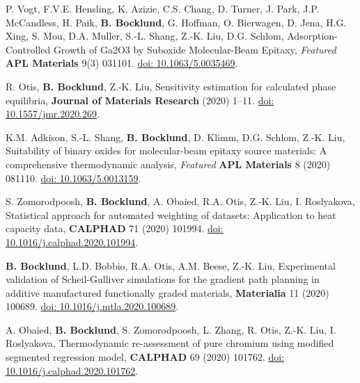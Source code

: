 \item P. Vogt, F.V.E. Hensling, K. Azizie, C.S. Chang, D. Turner, J. Park, J.P. McCandless, H. Paik, \textbf{B. Bocklund}, G. Hoffman, O. Bierwagen, D. Jena, H.G. Xing, S. Mou, D.A. Muller, S.-L. Shang, Z.-K. Liu, D.G. Schlom,
Adsorption-Controlled Growth of Ga2O3 by Suboxide Molecular-Beam Epitaxy,
  \textit{Featured} \textbf{APL Materials} 9(3) 031101.
  \href{https://doi.org/10.1063/5.0035469}{doi: 10.1063/5.0035469}.


\item R. Otis, \textbf{B. Bocklund}, Z.-K. Liu,
Sensitivity estimation for calculated phase equilibria,
  \textbf{Journal of Materials Research} (2020) 1–11.
  \href{https://doi.org/10.1557/jmr.2020.269}{doi: 10.1557/jmr.2020.269}.

\item K.M. Adkison, S.-L. Shang, \textbf{B. Bocklund}, D. Klimm, D.G. Schlom, Z.-K. Liu,
Suitability of binary oxides for molecular-beam epitaxy source materials: A comprehensive thermodynamic analysis,
  \textit{Featured} \textbf{APL Materials} 8 (2020) 081110.
  \href{https://doi.org/10.1063/5.0013159}{doi: 10.1063/5.0013159}.

\item S. Zomorodpoosh, \textbf{B. Bocklund}, A. Obaied, R.A. Otis, Z.-K. Liu, I. Roslyakova,
Statistical approach for automated weighting of datasets: Application to heat capacity data,
  \textbf{CALPHAD} 71 (2020) 101994.
  \href{https://doi.org/10.1016/j.calphad.2020.101994}{doi: 10.1016/j.calphad.2020.101994}.

\item \textbf{B. Bocklund}, L.D. Bobbio, R.A. Otis, A.M. Beese, Z.-K. Liu,
Experimental validation of Scheil-Gulliver simulations for the gradient path planning in additive manufactured functionally graded materials,
  \textbf{Materialia} 11 (2020) 100689.
  \href{https://doi.org/10.1016/j.mtla.2020.100689}{doi: 10.1016/j.mtla.2020.100689}.

\item A. Obaied, \textbf{B. Bocklund}, S. Zomorodpoosh, L. Zhang, R. Otis, Z.-K. Liu, I. Roslyakova,
  Thermodynamic re-assessment of pure chromium using modified segmented regression model,
  \textbf{CALPHAD} 69 (2020) 101762.
  \href{https://doi.org/10.1016/j.calphad.2020.101762}{doi: 10.1016/j.calphad.2020.101762}.

